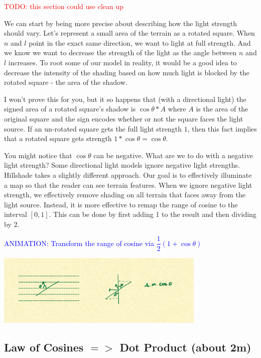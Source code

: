 \documentclass{article}
\newcommand\todo[1]{\textcolor{red}{TODO: #1}}
\newcommand\animation[1]{\textcolor{blue}{ANIMATION: #1}}
\begin{document}
\todo {this section could use clean up}

We can start by being more precise about describing how the light strength should vary.
Let's represent a small area of the terrain as a rotated square.
When $n$ and $l$ point in the exact same direction, we want to light at full strength.
And we know we want to decrease the strength of the light as the angle between $n$ and $l$ increases.
To root some of our model in reality, it would be a good idea to decrease the intensity of the shading based on how much light is blocked by the rotated square - the area of the shadow.

I won't prove this for you, but it so happens that (with a directional light) the signed area of a rotated square's shadow is $\cos \theta * A$ where $A$ is the area of the original square and the sign encodes whether or not the square faces the light source.
If an un-rotated square gets the full light strength $1$, then this fact implies that a rotated square gets strength $1 * \cos \theta = \cos \theta$.

You might notice that $\cos \theta$ can be negative.
What are we to do with a negative light strength?
Some directional light models ignore negative light strengths.
Hillshade takes a slightly different approach.
Our goal is to effectively illuminate a map so that the reader can see terrain features.
When we ignore negative light strength, we effectively remove shading on all terrain that faces away from the light source.
Instead, it is more effective to remap the range of cosine to the interval $[0, 1]$.
This can be done by first adding 1 to the result and then dividing by 2.
 
\animation{Transform the range of cosine via $\dfrac{1}{2}(1 + \cos \theta)$}

\begin{center}
	\includegraphics[width=0.75\textwidth,frame]{assets/cosine.jpg}
\end{center}

\subsection{Law of Cosines $=>$ Dot Product (about 2m)}
\end{document}
